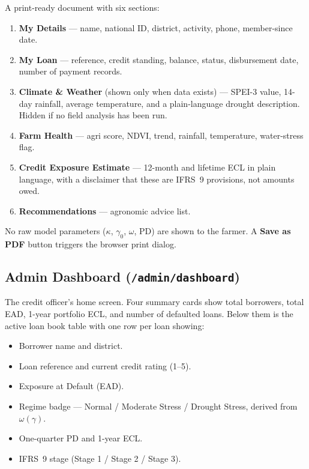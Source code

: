 \documentclass[12pt,a4paper]{article}
\begin{document}
A print-ready document with six sections:

\begin{enumerate}
  \item \textbf{My Details} --- name, national ID, district, activity, phone,
        member-since date.
  \item \textbf{My Loan} --- reference, credit standing, balance, status,
        disbursement date, number of payment records.
  \item \textbf{Climate \& Weather} (shown only when data exists) --- SPEI-3
        value, 14-day rainfall, average temperature, and a plain-language
        drought description.  Hidden if no field analysis has been run.
  \item \textbf{Farm Health} --- agri score, NDVI, trend, rainfall, temperature,
        water-stress flag.
  \item \textbf{Credit Exposure Estimate} --- 12-month and lifetime ECL in
        plain language, with a disclaimer that these are IFRS~9 provisions, not
        amounts owed.
  \item \textbf{Recommendations} --- agronomic advice list.
\end{enumerate}

No raw model parameters ($\kappa$, $\gamma_0$, $\omega$, PD) are shown to
the farmer.  A \textbf{Save as PDF} button triggers the browser print dialog.

\subsection{Admin Dashboard (\texttt{/admin/dashboard})}

The credit officer's home screen.  Four summary cards show total borrowers,
total EAD, 1-year portfolio ECL, and number of defaulted loans.  Below them
is the active loan book table with one row per loan showing:

\begin{itemize}[leftmargin=1.5em]
  \item Borrower name and district.
  \item Loan reference and current credit rating (1--5).
  \item Exposure at Default (EAD).
  \item Regime badge --- Normal / Moderate Stress / Drought Stress, derived
        from $\omega(\gamma)$.
  \item One-quarter PD and 1-year ECL.
  \item IFRS~9 stage (Stage 1 / Stage 2 / Stage 3).
\end{itemize}
\end{document}
